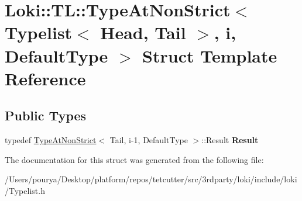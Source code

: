 \hypertarget{structLoki_1_1TL_1_1TypeAtNonStrict_3_01Typelist_3_01Head_00_01Tail_01_4_00_01i_00_01DefaultType_01_4}{}\section{Loki\+:\+:T\+L\+:\+:Type\+At\+Non\+Strict$<$ Typelist$<$ Head, Tail $>$, i, Default\+Type $>$ Struct Template Reference}
\label{structLoki_1_1TL_1_1TypeAtNonStrict_3_01Typelist_3_01Head_00_01Tail_01_4_00_01i_00_01DefaultType_01_4}
\subsection*{Public Types}
\begin{DoxyCompactItemize}
\item 
\hypertarget{structLoki_1_1TL_1_1TypeAtNonStrict_3_01Typelist_3_01Head_00_01Tail_01_4_00_01i_00_01DefaultType_01_4_a18c3f018752874da59888034dbd89d0a}{}typedef \hyperlink{structLoki_1_1TL_1_1TypeAtNonStrict}{Type\+At\+Non\+Strict}$<$ Tail, i-\/1, Default\+Type $>$\+::Result {\bfseries Result}\label{structLoki_1_1TL_1_1TypeAtNonStrict_3_01Typelist_3_01Head_00_01Tail_01_4_00_01i_00_01DefaultType_01_4_a18c3f018752874da59888034dbd89d0a}

\end{DoxyCompactItemize}


The documentation for this struct was generated from the following file\+:\begin{DoxyCompactItemize}
\item 
/\+Users/pourya/\+Desktop/platform/repos/tetcutter/src/3rdparty/loki/include/loki/Typelist.\+h\end{DoxyCompactItemize}
